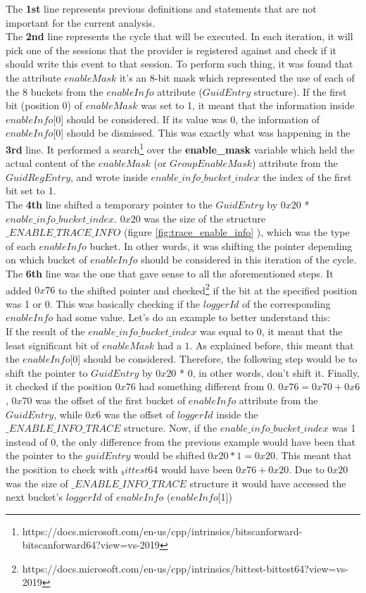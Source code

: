 The {\bfseries 1st} line represents previous definitions and statements that are not important for the current analysis. \\
The {\bfseries 2nd} line represents the cycle that will be executed. In each iteration, it will pick one of the sessions that the provider is registered against and check if it should write this event to that session.
To perform such thing, it was found that the attribute $enableMask$ it's an 8-bit mask which represented the use of each of the 8 buckets from the $enableInfo$ attribute ($GuidEntry$ structure). If the first bit (position 0) of $enableMask$ was set to 1, it meant that the information inside $enableInfo$[0] should be considered. If its value was 0, the information of $enableInfo$[0] should be dismissed. 
This was exactly what was happening in the {\bfseries 3rd} line. It performed a search\footnote{https://docs.microsoft.com/en-us/cpp/intrinsics/bitscanforward-bitscanforward64?view=vs-2019} over the {\bfseries enable\_mask} variable which held the actual content of the $enableMask$ (or $GroupEnableMask$) attribute from the $GuidRegEntry$, and wrote inside $enable\_info\_bucket\_index$ the index of the first bit set to 1. \\
The {\bfseries 4th} line shifted a temporary pointer to the $GuidEntry$ by $0x20$ * $enable\_info\_bucket\_index$. $0x20$ was the size of the structure $\_ENABLE\_TRACE\_INFO$ (figure \ref{fig:trace_enable_info} ), which was the type of each $enableInfo$ bucket. In other words, it was shifting the pointer depending on which bucket of $enableInfo$ should be considered in this iteration of the cycle.\\
The {\bfseries 6th} line was the one that gave sense to all the aforementioned steps. It added $0x76$ to the shifted pointer and checked\footnote{https://docs.microsoft.com/en-us/cpp/intrinsics/bittest-bittest64?view=vs-2019} if the bit at the specified position was 1 or 0. This was basically checking if the $loggerId$ of the corresponding $enableInfo$ had some value. Let's do an example to better understand this: \\
If the result of the $enable\_info\_bucket\_index$ was equal to 0, it meant that the least significant bit of $enableMask$ had a $1$. As explained before, this meant that the $enableInfo$[0] should be considered. Therefore, the following step would be to shift the pointer to $GuidEntry$ by $0x20$ * 0, in other words, don't shift it. Finally, it checked if the position $0x76$ had something different from 0. $0x76 = 0x70 + 0x6$,  $0x70$ was the offset of the first bucket of $enableInfo$ attribute from the $GuidEntry$, while $0x6$ was the offset of $loggerId$ inside the $\_ENABLE\_INFO\_TRACE$ structure. Now, if the $enable\_info\_bucket\_index$ was 1 instead of 0, the only difference from the previous example would have been that the pointer to the $guidEntry$ would be shifted $0x20 * 1 = 0x20$. This meant that the position to check with $_bittest64$ would have been $0x76 + 0x20$. Due to $0x20$ was the size of $\_ENABLE\_INFO\_TRACE$ structure it would have accessed the next bucket's $loggerId$ of $enableInfo$ ($enableInfo$[1])\\
